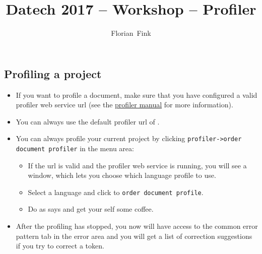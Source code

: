 
\title{Datech 2017 -- \pocoto{} Workshop -- Profiler}
\author{Florian~Fink}



\begin{frame}
	\titlepage
\end{frame}

\begin{frame}

\end{frame}

\subsection{Profiling a project}
\begin{frame}
	\begin{itemize}
		\item If you want to profile a document, make sure that you have
			configured a valid profiler web service url (see the
			\href{https://github.com/cisocrgroup/Resources/blob/master/manuals/profiler-manual.md}{profiler
			manual} for more information).
		\item You can always use the default profiler url of \pocoto{}.
		\item You can always profile your current project by clicking
			\texttt{profiler->order document profiler} in the menu area:
					\begin{itemize}
						\item If the url is valid and the profiler web service is running, you
							will see a window, which lets you choose which language profile
							to use.
						\item Select a language and click to \texttt{order document profile}.
						\item Do as \pocoto{} says and get your self some coffee.
					\end{itemize}
				\item After the profiling has stopped, you now will have access to the
					common error pattern tab in the error area and you will get a list
					of correction suggestions if you try to correct a token.
	\end{itemize}
\end{frame}


